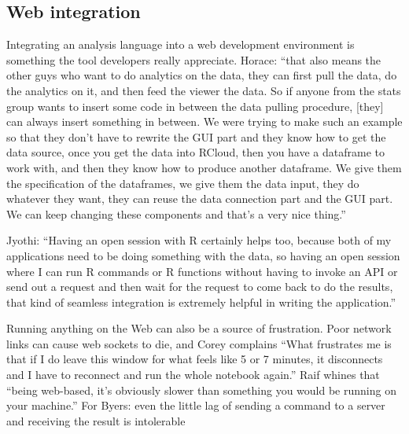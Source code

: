 \subsection{Web integration}
Integrating an analysis language into a web development environment is something
the tool developers really appreciate.  Horace: ``that also means the other guys
who want to do analytics on the data, they can first pull the data, do the
analytics on it, and then feed the viewer the data. So if anyone from the stats
group wants to insert some code in between the data pulling procedure, [they]
can always insert something in between. We were trying to make such an example
so that they don't have to rewrite the GUI part and they know how to get the
data source, once you get the data into RCloud, then you have a dataframe to
work with, and then they know how to produce another dataframe. We give them the
specification of the dataframes, we give them the data input, they do whatever
they want, they can reuse the data connection part and the GUI part. We can keep
changing these components and that's a very nice thing.''

Jyothi: ``Having an open session with R certainly helps too, because both of my
applications need to be doing something with the data, so having an open session
where I can run R commands or R functions without having to invoke an API or send
out a request and then wait for the request to come back to do the results,
that kind of seamless integration is extremely helpful in writing the
application.''



Running anything on the Web can also be a source of frustration.  Poor network
links can cause web sockets to die, and Corey complains ``What frustrates me is
that if I do leave this window for what feels like 5 or 7 minutes, it
disconnects and I have to reconnect and run the whole notebook again.'' Raif
whines that ``being web-based, it's obviously slower than something you would be
running on your machine.'' For Byers: even the little lag of sending a command
to a server and receiving the result is intolerable


